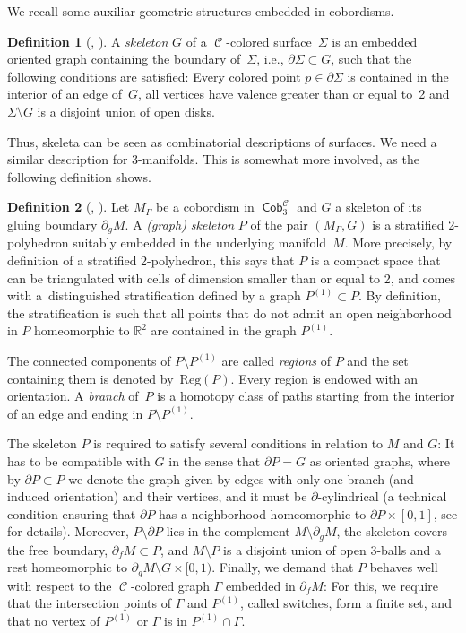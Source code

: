 \documentclass[10pt,a4paper]{amsart}
\DeclareMathOperator{\Cob}{\mathsf{Cob}}
\DeclareMathOperator{\calc}{\mathcal{C}}
\numberwithin{equation}{section}
\theoremstyle{definition}
\newtheorem{Definition}[Definition]{Definition}
\begin{document}
We recall some auxiliar geometric structures embedded in cobordisms.
\begin{Definition}[{\cite[Definition~4.2.13]{F}, \cite[Section~15.7.1]{TV}}]
 \label{defSkel}
 A \textit{skeleton} $G$ of a $\calc$-colored surface~$\Sigma$ is an embedded oriented graph containing the boundary of~$\Sigma$, i.e., $\partial \Sigma \subset G$, such that the following conditions are satisfied: Every colored point $p \in \partial\Sigma$ is contained in the interior of an edge of~$G$, all vertices have valence greater than or equal to~2 and $\Sigma \setminus G$ is a disjoint union of open disks.
\end{Definition}
Thus, skeleta can be seen as combinatorial descriptions of surfaces. We need a similar description for 3-manifolds. This is somewhat more involved, as the following definition shows.
\begin{Definition}[{\cite[Definitions 4.2.17 and 4.2.18]{F}, \cite[Sections 11.1.2 and 11.5.1]{TV}}]
 \label{defGraphSkel}
 Let $M_{\Gamma}$ be a cobordism in $\Cob_3^{\calc}$ and $G$ a skeleton of its gluing boundary $\partial_gM$. A \textit{(graph) skeleton} $P$ of the pair $(M_{\Gamma}, G)$ is a stratified 2-polyhedron suitably embedded in the underlying mani\-fold~$M$. More precisely, by definition of a stratified 2-polyhedron, this says that $P$ is a compact space that can be triangulated with cells of dimension smaller than or equal to 2, and comes with a~distinguished stratification defined by a graph $P^{(1)} \subset P$. By definition, the stratification is such that all points that do not admit an open neighborhood in $P$ homeomorphic to $\mathbb{R}^2$ are contained in the graph $P^{(1)}$.

The connected components of $P\setminus P^{(1)}$ are called \textit{regions} of $P$ and the set containing them is denoted by~$\mathrm{Reg}(P)$.
Every region is endowed with an orientation.
A \textit{branch} of~$P$ is a homotopy class of paths starting from the interior of an edge and ending in $P \setminus P^{(1)}$.

 The skeleton $P$ is required to satisfy several conditions in relation to $M$ and $G$: It has to be compatible with $G$ in the sense that $\partial P = G$ as oriented graphs, where by $\partial P \subset P$ we denote the graph given by edges with only one branch (and induced orientation) and their vertices, and it must be $\partial$-cylindrical (a technical condition ensuring that $\partial P$ has a neighborhood homeomorphic to $\partial P \times [0,1]$, see \cite[Section~11.1.4]{TV} for details). Moreover, $P \setminus \partial P$ lies in the complement $M \setminus \partial _gM$, the skeleton covers the free boundary, $\partial _f M \subset P$, and $M \setminus P$ is a disjoint union of open 3-balls and a rest homeomorphic to $\partial_gM \setminus G \times [0,1)$. Finally, we demand that $P$ behaves well with respect to the $\calc$-colored graph $\Gamma$ embedded in $\partial_fM$: For this, we require that the intersection points of $\Gamma$ and $P^{(1)}$, called switches, form a finite set, and that no vertex of $P^{(1)}$ or $\Gamma$ is in $P^{(1)} \cap \Gamma$.
\end{Definition}
\end{document}
